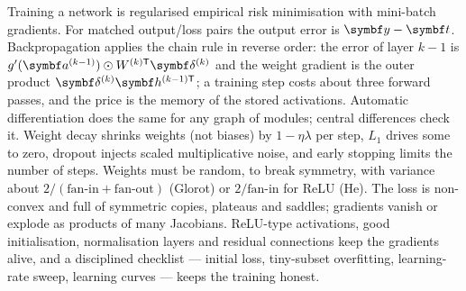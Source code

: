 \documentclass[11pt]{article}
\newcommand{\av}{\vect{a}}
\newcommand{\hv}{\vect{h}}
\newcommand{\yv}{\vect{y}}
\newcommand{\tvec}{\vect{t}}
\newcommand{\dv}{\vect{\delta}}
\begin{document}
\begin{keyidea}[Summary]
Training a network is regularised empirical risk minimisation with mini-batch gradients. For matched output/loss pairs
the output error is $\yv - \tvec$. Backpropagation applies the chain rule in reverse order: the error of layer $k - 1$ is
$g'(\av^{(k-1)}) \odot W^{(k)\mathsf{T}}\dv^{(k)}$ and the weight gradient is the outer product $\dv^{(k)}\hv^{(k-1)\mathsf{T}}$; a
training step costs about three forward passes, and the price is the memory of the stored activations. Automatic
differentiation does the same for any graph of modules; central differences check it. Weight decay shrinks weights (not
biases) by $1 - \eta\lambda$ per step, $L_1$ drives some to zero, dropout injects scaled multiplicative noise, and early
stopping limits the number of steps. Weights must be random, to break symmetry, with variance about
$2/(\text{fan-in} + \text{fan-out})$ (Glorot) or $2/\text{fan-in}$ for ReLU (He). The loss is non-convex and full of symmetric copies, plateaus and saddles;
gradients vanish or explode as products of many Jacobians. ReLU-type activations, good initialisation, normalisation
layers and residual connections keep the gradients alive, and a disciplined checklist --- initial loss, tiny-subset
overfitting, learning-rate sweep, learning curves --- keeps the training honest.
\end{keyidea}
\end{document}
